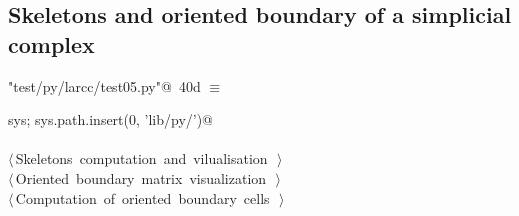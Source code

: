 \documentclass[11pt,oneside]{article}	%
\begin{document}
\subsection{Skeletons and oriented boundary of a simplicial complex}


\begin{flushleft} \small
\begin{minipage}{\linewidth} \label{scrap83}
\protect{}\verb@"test/py/larcc/test05.py"@\nobreak\ {\footnotesize 40d }$\equiv$
\vspace{-1ex}
\begin{list}{}{} \item
\mbox{}\verb@import sys; sys.path.insert(0, 'lib/py/')@\\
\mbox{}\verb@@\\
\mbox{}\verb@@\hbox{$\langle\,$Skeletons computation and vilualisation\nobreak\ {\footnotesize {}}$\,\rangle$}\verb@@\\
\mbox{}\verb@@\hbox{$\langle\,$Oriented boundary matrix visualization\nobreak\ {\footnotesize {}}$\,\rangle$}\verb@@\\
\mbox{}\verb@@\hbox{$\langle\,$Computation of oriented boundary cells\nobreak\ {\footnotesize {}}$\,\rangle$}\verb@@\\
\mbox{}\verb@@{\NWsep}
\end{list}
\vspace{-2ex}
\end{minipage}\\[4ex]
\end{flushleft}
\end{document}
